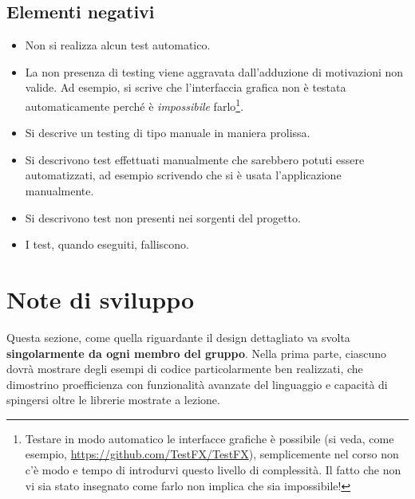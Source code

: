\documentclass[a4paper,12pt]{report}
\begin{document}
\subsection*{Elementi negativi}
\begin{itemize}
 \item Non si realizza alcun test automatico.
 \item La non presenza di testing viene aggravata dall'adduzione di motivazioni non valide. Ad esempio, si scrive che l'interfaccia grafica non è testata automaticamente perché è \emph{impossibile} farlo\footnote{Testare in modo automatico le interfacce grafiche è possibile (si veda, come esempio, \url{https://github.com/TestFX/TestFX}), semplicemente nel corso non c'è modo e tempo di introdurvi questo livello di complessità. Il fatto che non vi sia stato insegnato come farlo non implica che sia impossibile!}.
 \item Si descrive un testing di tipo manuale in maniera prolissa.
 \item Si descrivono test effettuati manualmente che sarebbero potuti essere automatizzati, ad esempio scrivendo che si è usata l'applicazione manualmente.
 \item Si descrivono test non presenti nei sorgenti del progetto.
 \item I test, quando eseguiti, falliscono.
\end{itemize}

\section{Note di sviluppo}

Questa sezione, come quella riguardante il design dettagliato va svolta \textbf{singolarmente da ogni membro del gruppo}.
%
Nella prima parte, ciascuno dovrà mostrare degli esempi di codice particolarmente ben realizzati,
che dimostrino proefficienza con funzionalità avanzate del linguaggio e capacità di spingersi oltre le librerie mostrate a lezione.
\end{document}
